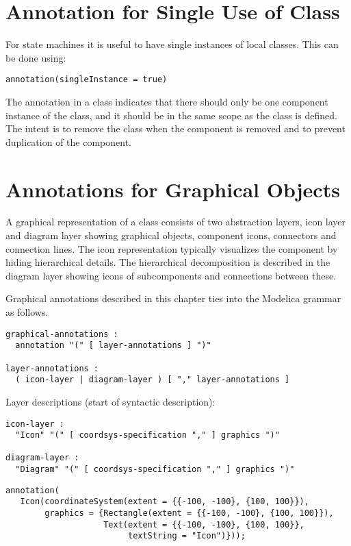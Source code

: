 \section{Annotation for Single Use of Class}\label{annotation-for-single-use-of-class}

For state machines it is useful to have single instances of local classes.
This can be done using:
\begin{lstlisting}[language=modelica]
annotation(singleInstance = true)
\end{lstlisting}

The annotation  in a class indicates that there should only be one component instance of the class, and it should be in the same scope as the class is defined.
The intent is to remove the class when the component is removed and to prevent duplication of the component.


\section{Annotations for Graphical Objects}\label{annotations-for-graphical-objects}

A graphical representation of a class consists of two abstraction
layers, icon layer and diagram layer showing graphical objects,
component icons, connectors and connection lines. The icon
representation typically visualizes the component by hiding hierarchical
details. The hierarchical decomposition is described in the diagram
layer showing icons of subcomponents and connections between these.

Graphical annotations described in this chapter ties into the Modelica
grammar as follows.
\begin{lstlisting}[language=grammar]
graphical-annotations :
  annotation "(" [ layer-annotations ] ")"

layer-annotations :
  ( icon-layer | diagram-layer ) [ "," layer-annotations ]
\end{lstlisting}
Layer descriptions (start of syntactic description):
\begin{lstlisting}[language=grammar]
icon-layer :
  "Icon" "(" [ coordsys-specification "," ] graphics ")"

diagram-layer :
  "Diagram" "(" [ coordsys-specification "," ] graphics ")"
\end{lstlisting}%

\begin{example}
\begin{lstlisting}[language=modelica]
annotation(
   Icon(coordinateSystem(extent = {{-100, -100}, {100, 100}}),
        graphics = {Rectangle(extent = {{-100, -100}, {100, 100}}),
                    Text(extent = {{-100, -100}, {100, 100}},
                         textString = "Icon")}));
\end{lstlisting}
\end{example}

